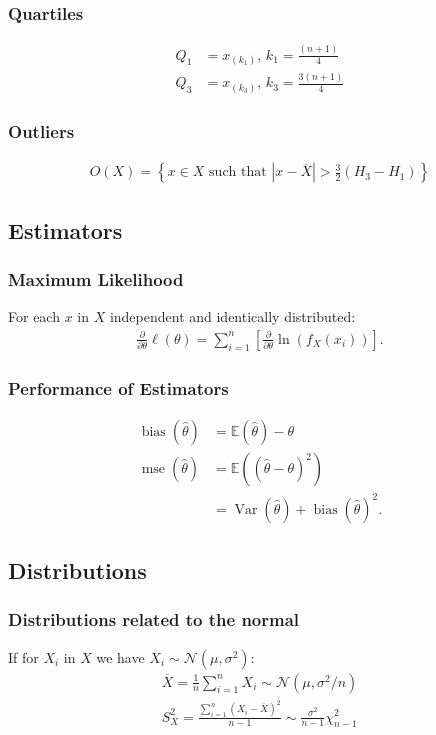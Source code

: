 \documentclass[a4paper, 12pt, twoside]{article}
\DeclareMathOperator{\Mse}{mse}
\DeclareMathOperator{\Bias}{bias}
\DeclareMathOperator{\Var}{Var}
\begin{document}
\subsubsection{Quartiles}
\begin{align*}
    Q_1 & = x_{(k_1)}, \, k_1 = \frac{ (n + 1)}{4} \tag{interpolated} \\
    Q_3 & = x_{(k_3)}, \, k_3 = \frac{3(n + 1)}{4} \tag{interpolated}
\end{align*}

\subsubsection{Outliers}
\begin{gather*}
    O(X) = \left\{x \in X \text{ such that }
    |x - \overline{X}| > \frac{3}{2}(H_3 - H_1)\right\}
\end{gather*}

\subsection{Estimators}

\subsubsection{Maximum Likelihood}
For each $x$ in $X$ independent and identically distributed:
\begin{gather*}
    \frac{\partial}{\partial\theta}\ell(\theta) =
    \sum_{i = 1}^n\left[\frac{\partial}{\partial\theta}\ln{(f_X(x_i))}\right].
\end{gather*}

\subsubsection{Performance of Estimators}
\begin{align*}
    \Bias(\hat\theta) & = \mathbb{E}(\hat\theta) - \theta         \\
    \Mse(\hat\theta)  & = \mathbb{E}((\hat\theta - \theta)^2)     \\
                      & = \Var(\hat\theta) + \Bias(\hat\theta)^2.
\end{align*}

\subsection{Distributions}

\subsubsection{Distributions related to the normal}
If for $X_i$ in $X$ we have $X_i \sim \mathcal{N}(\mu, \sigma^2)$:
\begin{gather*}
    \overline{X} = \frac{1}{n} \sum_{i = 1}^n X_i
    \sim \mathcal{N}(\mu, \sigma^2 / n) \\
    S_X^2 = \frac{\sum_{i = 1}^n (X_i - \overline{X})^2}{n - 1}
    \sim \frac{\sigma^2}{n - 1} \chi^2_{n - 1}
\end{gather*}
\end{document}
